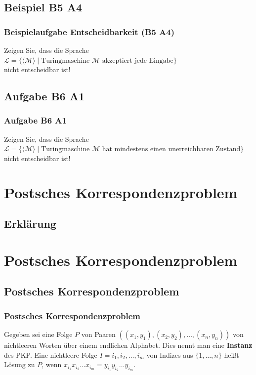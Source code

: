 \subsection{Beispiel B5 A4}
\begin{frame}
	\frametitle{Beispielaufgabe Entscheidbarkeit (B5 A4)}
	Zeigen Sie, dass die Sprache \\ $\mathcal{L} = \{ \langle \mathcal{M} \rangle \; | \; \mbox{Turingmaschine $\mathcal{M}$ akzeptiert jede Eingabe} \}$ \\ nicht entscheidbar ist!
\end{frame}
\subsection{Aufgabe B6 A1}
\begin{frame}
	\frametitle{Aufgabe B6 A1}
	Zeigen Sie, dass die Sprache \\ $\mathcal{L} = \{\langle\mathcal{M}\rangle \; | \; \mbox{Turingmaschine $\mathcal{M}$ hat mindestens einen unerreichbaren Zustand}\}$ \\ nicht entscheidbar ist!
\end{frame}

\section{Postsches Korrespondenzproblem}
\subsection{Erklärung}
\section{Postsches Korrespondenzproblem}
\subsection{Postsches Korrespondenzproblem}
\begin{frame}
\frametitle{Postsches Korrespondenzproblem}
Gegeben sei eine Folge $P$ von Paaren $((x_1, y_1), (x_2, y_2), \ldots, (x_n,y_n))$ von nichtleeren Worten über einem endlichen Alphabet. Dies nennt man eine \textbf{Instanz} des PKP.
Eine nichtleere Folge $I = i_1, i_2, \ldots, i_m$ von Indizes aus $\{1, \ldots, n\}$ heißt Lösung zu $P$, wenn $x_{i_1}x_{i_2}\ldots{}x_{i_m} = y_{i_1}y_{i_2}\ldots{}y_{i_m}$.
\end{frame}
